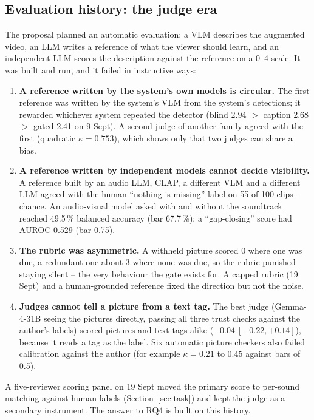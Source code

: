 \subsection{Evaluation history: the judge era}\label{sec:judge-era}
The proposal planned an automatic evaluation: a VLM describes the augmented video, an LLM writes a reference of what
the viewer should learn, and an independent LLM scores the description against the reference on a 0--4 scale. It
was built and run, and it failed in instructive ways:
\begin{enumerate}
  \item \textbf{A reference written by the system's own models is circular.} The first reference was written by the
        system's VLM from the system's detections; it rewarded whichever system repeated the detector (blind 2.94 $>$
        caption 2.68 $>$ gated 2.41 on 9 Sept). A second judge of another family agreed with the first
        (quadratic $\kappa = 0.753$), which shows only that two judges can share a bias.
  \item \textbf{A reference written by independent models cannot decide visibility.} A reference built by an audio
        LLM, CLAP, a different VLM and a different LLM agreed with the human ``nothing is missing'' label on 55 of 100
        clips -- chance. An audio-visual model asked with and without the soundtrack reached 49.5\,\% balanced
        accuracy (bar 67.7\,\%); a ``gap-closing'' score had AUROC 0.529 (bar 0.75).
  \item \textbf{The rubric was asymmetric.} A withheld picture scored 0 where one was due, a redundant one about 3
        where none was due, so the rubric punished staying silent -- the very behaviour the gate exists for. A capped
        rubric (19 Sept) and a human-grounded reference fixed the direction but not the noise.
  \item \textbf{Judges cannot tell a picture from a text tag.} The best judge (Gemma-4-31B seeing the pictures
        directly, passing all three trust checks against the author's labels) scored pictures and text tags alike
        ($-0.04\ [-0.22, +0.14]$), because it reads a tag as the label. Six automatic picture checkers also failed
        calibration against the author (for example $\kappa = 0.21$ to $0.45$ against bars of 0.5).
\end{enumerate}
A five-reviewer scoring panel on 19 Sept moved the primary score to per-sound matching against human labels
(Section~\ref{sec:task}) and kept the judge as a secondary instrument. The answer to RQ4 is built on this history.
